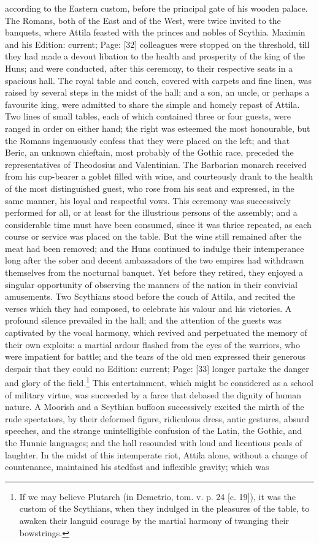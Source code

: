 according to the Eastern custom, before the principal gate of his wooden palace. The Romans, both of the East and of the West, were twice invited to the banquets, where Attila feasted with the princes and nobles of Scythia. Maximin and his Edition: current; Page: [32] colleagues were stopped on the threshold, till they had made a devout libation to the health and prosperity of the king of the Huns; and were conducted, after this ceremony, to their respective seats in a spacious hall. The royal table and couch, covered with carpets and fine linen, was raised by several steps in the midst of the hall; and a son, an uncle, or perhaps a favourite king, were admitted to share the simple and homely repast of Attila. Two lines of small tables, each of which contained three or four guests, were ranged in order on either hand; the right was esteemed the most honourable, but the Romans ingenuously confess that they were placed on the left; and that Beric, an unknown chieftain, most probably of the Gothic race, preceded the representatives of Theodosius and Valentinian. The Barbarian monarch received from his cup-bearer a goblet filled with wine, and courteously drank to the health of the most distinguished guest, who rose from his seat and expressed, in the same manner, his loyal and respectful vows. This ceremony was successively performed for all, or at least for the illustrious persons of the assembly; and a considerable time must have been consumed, since it was thrice repeated, as each course or service was placed on the table. But the wine still remained after the meat had been removed; and the Huns continued to indulge their intemperance long after the sober and decent ambassadors of the two empires had withdrawn themselves from the nocturnal banquet. Yet before they retired, they enjoyed a singular opportunity of observing the manners of the nation in their convivial amusements. Two Scythians stood before the couch of Attila, and recited the verses which they had composed, to celebrate his valour and his victories. A profound silence prevailed in the hall; and the attention of the guests was captivated by the vocal harmony, which revived and perpetuated the memory of their own exploits: a martial ardour flashed from the eyes of the warriors, who were impatient for battle; and the tears of the old men expressed their generous despair that they could no Edition: current; Page: [33] longer partake the danger and glory of the field.\footnote{If we may believe Plutarch (in Demetrio, tom. v. p. 24 [c. 19]), it was the custom of the Scythians, when they indulged in the pleasures of the table, to awaken their languid courage by the martial harmony of twanging their bowstrings.} This entertainment, which might be considered as a school of military virtue, was succeeded by a farce that debased the dignity of human nature. A Moorish and a Scythian buffoon successively excited the mirth of the rude spectators, by their deformed figure, ridiculous dress, antic gestures, absurd speeches, and the strange unintelligible confusion of the Latin, the Gothic, and the Hunnic languages; and the hall resounded with loud and licentious peals of laughter. In the midst of this intemperate riot, Attila alone, without a change of countenance, maintained his stedfast and inflexible gravity; which was 